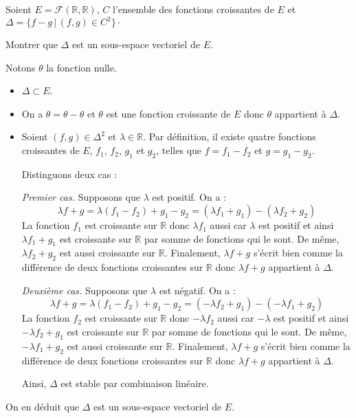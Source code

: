 \documentclass[a4paper,10pt]{report}
\begin{document}
\medskip

\begin{Exercice}{} Soient $E = \mathcal{F}(\mathbb{R}, \mathbb{R})$, $C$ l'ensemble des fonctions croissantes de $E$ et $\Delta = \lbrace f-g \, \vert \, (f,g) \in C^2 \rbrace\cdot$

\noindent Montrer que $\Delta$ est un sous-espace vectoriel de $E$.
\end{Exercice}

\corr Notons $\theta$ la fonction nulle.

\begin{itemize}
\item $\Delta \subset E$.
\item On a $\theta = \theta - \theta$ et $\theta$ est une fonction croissante de $E$ donc $\theta$ appartient à $\Delta$.
\item Soient $(f,g) \in \Delta^2$ et $\lambda \in \mathbb{R}$. Par définition, il existe quatre fonctions croissantes de $E$, $f_1$, $f_2$, $g_1$ et $g_2$, telles que $f=f_1- f_2$ et $g= g_1-g_2$.

\medskip

\noindent Distinguons deux cas :

\noindent \textit{Premier cas.} Supposons que $\lambda$ est positif. On a :
$$ \lambda f+g = \lambda (f_1-f_2) + g_1- g_2 = (\lambda f_1 + g_1) - (\lambda f_2+g_2)$$
La fonction $f_1$ est croissante sur $\mathbb{R}$ donc $\lambda f_1$ aussi car $\lambda$ est positif et ainsi $\lambda f_1 + g_1$ est croissante sur $\mathbb{R}$ par somme de fonctions qui le sont. De même, $\lambda f_2+g_2$ est aussi croissante sur $\mathbb{R}$. Finalement, $\lambda f+g$ s'écrit bien comme la différence de deux fonctions croissantes sur $\mathbb{R}$ donc $\lambda f+g$ appartient à $\Delta$.

\medskip

\noindent \textit{Deuxième cas.} Supposons que $\lambda$ est négatif. On a :
$$ \lambda f+g = \lambda (f_1-f_2) + g_1- g_2 = (-\lambda f_2 + g_1) - (-\lambda f_1+g_2)$$
La fonction $f_2$ est croissante sur $\mathbb{R}$ donc $-\lambda f_2$ aussi car $-\lambda$ est positif et ainsi $-\lambda f_2 + g_1$ est croissante sur $\mathbb{R}$ par somme de fonctions qui le sont. De même, $-\lambda f_1+g_2$ est aussi croissante sur $\mathbb{R}$. Finalement, $\lambda f+g$ s'écrit bien comme la différence de deux fonctions croissantes sur $\mathbb{R}$ donc $\lambda f+g$ appartient à $\Delta$.

\medskip

\noindent Ainsi, $\Delta$ est stable par combinaison linéaire.
\end{itemize}
On en déduit que $\Delta$ est un sous-espace vectoriel de $E$.
\end{document}
